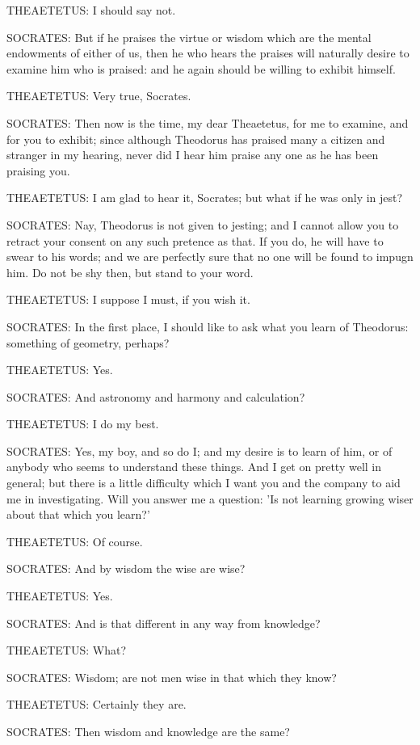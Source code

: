THEAETETUS: I should say not.

SOCRATES: But if he praises the virtue or wisdom which are the mental
endowments of either of us, then he who hears the praises will naturally
desire to examine him who is praised: and he again should be willing to
exhibit himself.

THEAETETUS: Very true, Socrates.

SOCRATES: Then now is the time, my dear Theaetetus, for me to examine,
and for you to exhibit; since although Theodorus has praised many a
citizen and stranger in my hearing, never did I hear him praise any one
as he has been praising you.

THEAETETUS: I am glad to hear it, Socrates; but what if he was only in
jest?

SOCRATES: Nay, Theodorus is not given to jesting; and I cannot allow you
to retract your consent on any such pretence as that. If you do, he will
have to swear to his words; and we are perfectly sure that no one will
be found to impugn him. Do not be shy then, but stand to your word.

THEAETETUS: I suppose I must, if you wish it.

SOCRATES: In the first place, I should like to ask what you learn of
Theodorus: something of geometry, perhaps?

THEAETETUS: Yes.

SOCRATES: And astronomy and harmony and calculation?

THEAETETUS: I do my best.

SOCRATES: Yes, my boy, and so do I; and my desire is to learn of him,
or of anybody who seems to understand these things. And I get on pretty
well in general; but there is a little difficulty which I want you and
the company to aid me in investigating. Will you answer me a question:
'Is not learning growing wiser about that which you learn?'

THEAETETUS: Of course.

SOCRATES: And by wisdom the wise are wise?

THEAETETUS: Yes.

SOCRATES: And is that different in any way from knowledge?

THEAETETUS: What?

SOCRATES: Wisdom; are not men wise in that which they know?

THEAETETUS: Certainly they are.

SOCRATES: Then wisdom and knowledge are the same?

